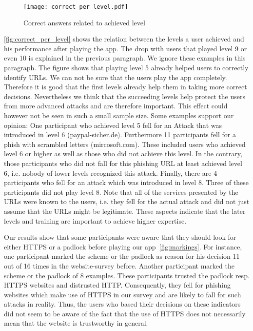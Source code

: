 \begin{description}[leftmargin=0cm]
		\begin{figure}
			\centering
			\texttt{[image: correct\_per\_level.pdf]}
			\caption{Correct answers related to achieved level}
			\label{fig:correct_per_level}
			\end{figure}
	\autoref{fig:correct_per_level} shows the relation between the levels a user achieved and his performance after playing the app. The drop with users that played level 9 or even 10 is explained in the previous paragraph. We ignore these examples in this paragraph. The figure shows that playing level 5 already helped users to correctly identify URLs. We can not be sure that the users play the app completely. Therefore it is good that the first levels already help them in taking more correct decisions. Nevertheless we think that the succeeding levels help protect the users from more advanced attacks and are therefore important. This effect could however not be seen in such a small sample size. Some examples support our opinion: One participant who achieved level 5 fell for an Attack that was introduced in level 6 (paypal-sicher.de). Furthermore 11 participants fell for a phish with scrambled letters (mircosoft.com). These included users who achieved level 6 or higher as well as those who did not achieve this level. In the contrary, those participants who did not fall for this phishing URL at least achieved level 6, i.e. nobody of lower levels recognized this attack. 
	Finally, there are 4 participants who fell for an attack which was introduced in level 8. Three of these participants did not play level 8.
	Note that all of the services presented by the URLs were known to the users, i.e. they fell for the actual attack and did not just assume that the URLs might be legitimate.
	These aspects indicate that the later levels and training are important to achieve higher expertise.
	\item[HTTPS and Padlock:] Our results show that some participants were aware that they should look for either HTTPS or a padlock before playing our app~\autoref{fig:markings}.
	For instance, one participant marked the scheme or the padlock as reason for his decision 11 out of 16 times in the website-survey before. 
	Another participant marked the scheme or the padlock of 8 examples.
	These participants trusted the padlock resp. HTTPS websites and distrusted HTTP.
	Consequently, they fell for phishing websites which make use of HTTPS in our survey and are likely to fall for such attacks in reality.
	Thus, the users who based their decisions on these indicators did not seem to be aware of the fact that the use of HTTPS does not necessarily mean that the website is trustworthy in general.

\end{description}
